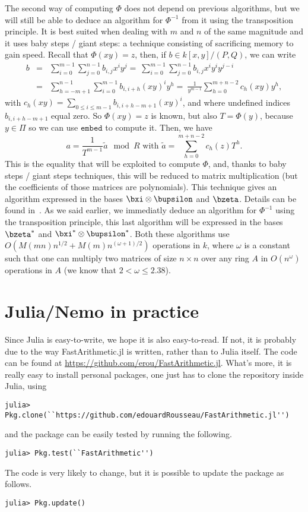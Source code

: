 \documentclass[a4paper,11pt]{article}
\theoremstyle{break}
\theoremstyle{definition}
\theoremstyle{remark}
\begin{document}
The second way of computing $\Phi$ does not depend on previous algorithms, but 
we will still be able to deduce an algorithm for $\Phi^{-1}$ from it using the 
transposition principle. It is best suited when dealing with $m$ and $n$ of the 
same magnitude and it uses baby steps / giant steps: a technique consisting of 
sacrificing memory to gain speed. Recall that $\Phi(xy)=z$, then, if $b\in 
k[x,y]/(P,Q)$, we can write
\begin{eqnarray*}
b&=&\sum_{i=0}^{m-1}\sum_{j=0}^{n-1} b_{i,j}x^i y^j
=~\sum_{i=0}^{m-1}\sum_{j=0}^{n-1} b_{i,j}x^i y^i y^{j-i}\\
&=&\sum_{h=-m+1}^{n-1}\sum_{i=0}^{m-1} b_{i,i+h}(xy)^i y^h
=~\frac{1}{y^{m-1}} \sum_{h=0}^{m+n-2} c_h(xy) y^h,
\end{eqnarray*}
with $c_h(xy)=\sum_{0 \leq i \leq m-1} b_{i,i+h-m+1} (xy)^i$, and where 
undefined indices $b_{i,i+h-m+1}$ equal zero. So $\Phi(xy)=z$ is known, but 
also $T=\Phi(y)$, because $y\in\Pi$ so we can use $\texttt{embed}$ to compute 
it. Then, we have 
\[
a = \frac{1}{T^{m-1}}\tilde a \mod R \text{ with } \tilde a = \sum_{h=0}^{m+n-2} 
c_h(z) T^h.
\]
This is the equality that will be exploited to compute $\Phi$, and, thanks to 
baby steps / giant steps techniques, this will be reduced to matrix 
multiplication (but the coefficients of those matrices are polynomials). This 
technique gives an algorithm expressed in the bases $\bxi\otimes\bupsilon$ and 
$\bzeta$. Details can be found in~\cite{DeDoSc14}. As we said earlier, we 
immediatly deduce an algorithm for $\Phi^{-1}$ using the 
transposition principle, this last algorithm will be expressed in the bases 
$\bzeta^*$ and $\bxi^*\otimes\bupsilon^*$. Both these algorithms use 
$O(M(mn)n^{1/2}+M(m)n^{(\omega+1)/2})$ operations in $k$, where $\omega$ is a 
constant such that one can multiply two matrices of size $n\times n$ over any 
ring $A$ in $O(n^\omega)$ operations in $A$ (we know that $2 < \omega \leq 
2.38$).


\section{Julia/Nemo in practice}
Since Julia is easy-to-write, we hope it is also
easy-to-read. If not, it is probably due to the way FastArithmetic.jl is written,
rather than to Julia itself. The code can be found at
\url{https://github.com/erou/FastArithmetic.jl}. What's more, it is really
easy to install personal packages, one just has to clone the repository
inside Julia, using
\begin{verbatim}
julia> Pkg.clone(``https://github.com/edouardRousseau/FastArithmetic.jl'') 
\end{verbatim}
and the package can be easily tested by running the following.
\begin{verbatim}
julia> Pkg.test(``FastArithmetic'') 
\end{verbatim}
The code is very likely to change, but it is possible to update the package as
follows.
\begin{verbatim}
julia> Pkg.update()
\end{verbatim}
\end{document}

